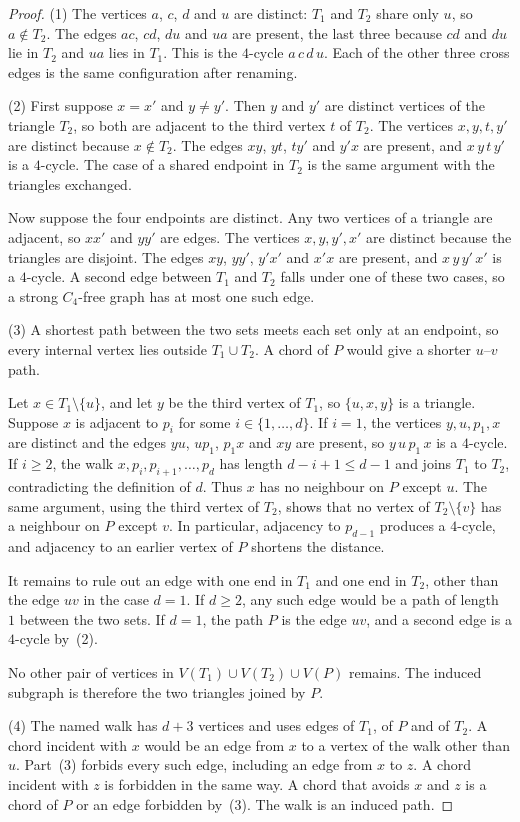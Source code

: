 \documentclass[ASNA]{USG}
\theoremstyle{WBstyletwo}
\numberwithin{equation}{section}
\begin{document}
\begin{proof}
(1) The vertices $a$, $c$, $d$ and $u$ are distinct: $T_1$ and $T_2$ share only $u$, so $a\notin T_2$. The edges $ac$, $cd$, $du$ and $ua$ are present, the last three because $cd$ and $du$ lie in $T_2$ and $ua$ lies in $T_1$. This is the $4$-cycle $a\,c\,d\,u$. Each of the other three cross edges is the same configuration after renaming.

(2) First suppose $x=x'$ and $y\neq y'$. Then $y$ and $y'$ are distinct vertices of the triangle $T_2$, so both are adjacent to the third vertex $t$ of $T_2$. The vertices $x,y,t,y'$ are distinct because $x\notin T_2$. The edges $xy$, $yt$, $ty'$ and $y'x$ are present, and $x\,y\,t\,y'$ is a $4$-cycle. The case of a shared endpoint in $T_2$ is the same argument with the triangles exchanged.

Now suppose the four endpoints are distinct. Any two vertices of a triangle are adjacent, so $xx'$ and $yy'$ are edges. The vertices $x,y,y',x'$ are distinct because the triangles are disjoint. The edges $xy$, $yy'$, $y'x'$ and $x'x$ are present, and $x\,y\,y'\,x'$ is a $4$-cycle. A second edge between $T_1$ and $T_2$ falls under one of these two cases, so a strong $C_4$-free graph has at most one such edge.

(3) A shortest path between the two sets meets each set only at an endpoint, so every internal vertex lies outside $T_1\cup T_2$. A chord of $P$ would give a shorter $u$--$v$ path.

Let $x\in T_1\setminus\{u\}$, and let $y$ be the third vertex of $T_1$, so $\{u,x,y\}$ is a triangle. Suppose $x$ is adjacent to $p_i$ for some $i\in\{1,\ldots,d\}$. If $i=1$, the vertices $y,u,p_1,x$ are distinct and the edges $yu$, $up_1$, $p_1x$ and $xy$ are present, so $y\,u\,p_1\,x$ is a $4$-cycle. If $i\ge 2$, the walk $x,p_i,p_{i+1},\ldots,p_d$ has length $d-i+1\le d-1$ and joins $T_1$ to $T_2$, contradicting the definition of $d$. Thus $x$ has no neighbour on $P$ except $u$. The same argument, using the third vertex of $T_2$, shows that no vertex of $T_2\setminus\{v\}$ has a neighbour on $P$ except $v$. In particular, adjacency to $p_{d-1}$ produces a $4$-cycle, and adjacency to an earlier vertex of $P$ shortens the distance.

It remains to rule out an edge with one end in $T_1$ and one end in $T_2$, other than the edge $uv$ in the case $d=1$. If $d\ge 2$, any such edge would be a path of length~$1$ between the two sets. If $d=1$, the path $P$ is the edge $uv$, and a second edge is a $4$-cycle by~(2).

No other pair of vertices in $V(T_1)\cup V(T_2)\cup V(P)$ remains. The induced subgraph is therefore the two triangles joined by $P$.

(4) The named walk has $d+3$ vertices and uses edges of $T_1$, of $P$ and of $T_2$. A chord incident with $x$ would be an edge from $x$ to a vertex of the walk other than $u$. Part~(3) forbids every such edge, including an edge from $x$ to $z$. A chord incident with $z$ is forbidden in the same way. A chord that avoids $x$ and $z$ is a chord of $P$ or an edge forbidden by~(3). The walk is an induced path.
\end{proof}
\end{document}
